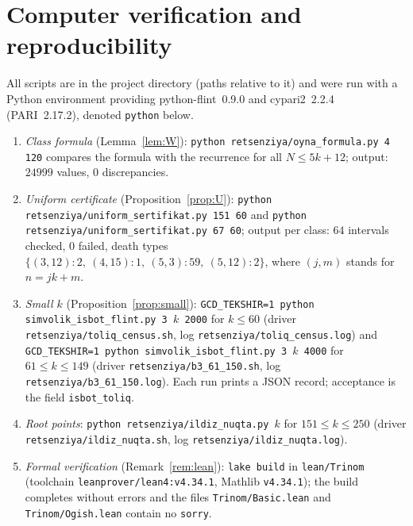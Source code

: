 \documentclass[11pt]{amsart}
\theoremstyle{definition}
\theoremstyle{remark}
\begin{document}
\section{Computer verification and reproducibility}\label{sec:repro}

\begingroup\raggedright
All scripts are in the project directory (paths relative to it) and were run with a
Python environment providing python-flint~0.9.0 and cypari2~2.2.4 (PARI~2.17.2),
denoted \texttt{python} below.
\begin{enumerate}
\item \emph{Class formula} (Lemma~\ref{lem:W}):
\texttt{python retsenziya/oyna\_formula.py 4 120} compares the formula with the
recurrence for all $N\le 5k+12$; output: $24999$ values, $0$ discrepancies.
\item \emph{Uniform certificate} (Proposition~\ref{prop:U}):
\texttt{python retsenziya/uniform\_sertifikat.py 151 60} and
\texttt{python retsenziya/uniform\_sertifikat.py 67 60}; output per class:
$64$ intervals checked, $0$ failed, death types
$\{(3,12)\!:\!2,\ (4,15)\!:\!1,\ (5,3)\!:\!59,\ (5,12)\!:\!2\}$, where $(j,m)$ stands for
$n=jk+m$.
\item \emph{Small $k$} (Proposition~\ref{prop:small}):
\texttt{GCD\_TEKSHIR=1 python simvolik\_isbot\_flint.py 3 $k$ 2000} for $k\le 60$
(driver \texttt{retsenziya/toliq\_census.sh}, log \texttt{retsenziya/toliq\_census.log}) and
\texttt{GCD\_TEKSHIR=1 python simvolik\_isbot\_flint.py 3 $k$ 4000} for $61\le k\le 149$
(driver \texttt{retsenziya/b3\_61\_150.sh}, log \texttt{retsenziya/b3\_61\_150.log}). Each run
prints a JSON record; acceptance is the field \texttt{isbot\_toliq}.
\item \emph{Root points}: \texttt{python retsenziya/ildiz\_nuqta.py $k$} for
$151\le k\le 250$ (driver \texttt{retsenziya/ildiz\_nuqta.sh}, log
\texttt{retsenziya/ildiz\_nuqta.log}).
\item \emph{Formal verification} (Remark~\ref{rem:lean}): \texttt{lake build} in
\texttt{lean/Trinom} (toolchain \texttt{leanprover/lean4:v4.34.1}, Mathlib
\texttt{v4.34.1}); the build completes without errors and the files
\texttt{Trinom/Basic.lean} and \texttt{Trinom/Ogish.lean} contain no \texttt{sorry}.
\end{enumerate}
\end{document}
